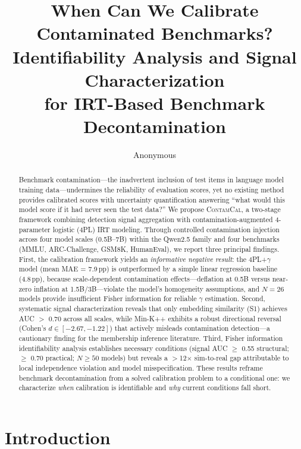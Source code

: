 \documentclass[11pt,a4paper]{article}
\title{When Can We Calibrate Contaminated Benchmarks?\\Identifiability Analysis and Signal Characterization\\for IRT-Based Benchmark Decontamination}
\author{Anonymous}
\date{}
\begin{document}
\maketitle

\begin{abstract}
Benchmark contamination---the inadvertent inclusion of test items in language model training data---undermines the reliability of evaluation scores, yet no existing method provides calibrated scores with uncertainty quantification answering ``what would this model score if it had never seen the test data?''
We propose \textsc{ContamCal}, a two-stage framework combining detection signal aggregation with contamination-augmented 4-parameter logistic (4PL) IRT modeling.
Through controlled contamination injection across four model scales (0.5B--7B) within the Qwen2.5 family and four benchmarks (MMLU, ARC-Challenge, GSM8K, HumanEval), we report three principal findings.
First, the calibration framework yields an \emph{informative negative result}: the 4PL+$\gamma$ model (mean MAE = 7.9\,pp) is outperformed by a simple linear regression baseline (4.8\,pp), because scale-dependent contamination effects---deflation at 0.5B versus near-zero inflation at 1.5B/3B---violate the model's homogeneity assumptions, and $N=26$ models provide insufficient Fisher information for reliable $\gamma$ estimation.
Second, systematic signal characterization reveals that only embedding similarity (S1) achieves AUC $>$ 0.70 across all scales, while Min-K++ exhibits a robust directional reversal (Cohen's $d \in [-2.67, -1.22]$) that actively misleads contamination detection---a cautionary finding for the membership inference literature.
Third, Fisher information identifiability analysis establishes necessary conditions (signal AUC $\geq$ 0.55 structural; $\geq$ 0.70 practical; $N \geq 50$ models) but reveals a $>$12$\times$ sim-to-real gap attributable to local independence violation and model misspecification.
These results reframe benchmark decontamination from a solved calibration problem to a conditional one: we characterize \emph{when} calibration is identifiable and \emph{why} current conditions fall short.
\end{abstract}

\section{Introduction}
\end{document}
